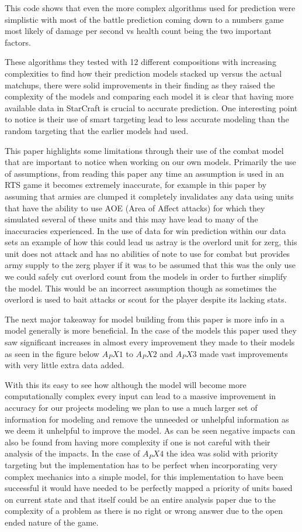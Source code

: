 \documentclass[a4paper,12pt]{report}
\begin{document}
This code shows that even the more complex algorithms used for prediction were simplistic with most of the battle prediction coming down to a numbers game most likely of damage per second vs health count being the two important factors.

These algorithms they tested with 12 different compositions with increasing complexities to find how their prediction models stacked up versus the actual matchups, there were solid improvements in their finding as they raised the complexity of the models and comparing each model it is clear that having more available data in StarCraft is crucial to accurate prediction. One interesting point to notice is their use of smart targeting lead to less accurate modeling than the random targeting that the earlier models had used.

This paper highlights some limitations through their use of the combat model that are important to notice when working on our own models. Primarily the use of assumptions, from reading this paper any time an assumption is used in an RTS game it becomes extremely inaccurate, for example in this paper by assuming that armies are clumped it completely invalidates any data using units that have the ability to use AOE (Area of Affect attacks) for which they simulated several of these units and this may have lead to many of the inaccuracies experienced. In the use of data for win prediction within our data sets an example of how this could lead us astray is the overlord unit for zerg, this unit does not attack and has no abilities of note to use for combat but provides army supply to the zerg player if it was to be assumed that this was the only use we could safely cut overlord count from the models in order to further simplify the model. This would be an incorrect assumption though as sometimes the overlord is used to bait attacks or scout for the player despite its lacking stats.

The next major takeaway for model building from this paper is more info in a model generally is more beneficial. In the case of the models this paper used they saw significant increases in almost every improvement they made to their models as seen in the figure below $A_PX1$ to $A_PX2$ and $A_PX3$ made vast improvements with very little extra data added.

With this its easy to see how although the model will become more computationally complex every input can lead to a massive improvement in accuracy for our projects modeling we plan to use a much larger set of information for modeling and remove the unneeded or unhelpful information as we deem it unhelpful to improve the model. As can be seen negative impacts can also be found from having more complexity if one is not careful with their analysis of the impacts. In the case of $A_PX4$ the idea was solid with priority targeting but the implementation has to be perfect when incorporating very complex mechanics into a simple model, for this implementation to have been successful it would have needed to be perfectly mapped a priority of units based on current state and that itself could be an entire analysis paper due to the complexity of a problem as there is no right or wrong answer due to the open ended nature of the game.
\end{document}
